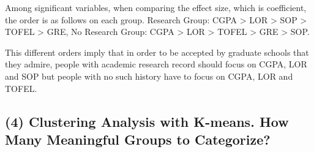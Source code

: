 \documentclass[11pt]{article}
\begin{document}
Among significant variables, when comparing the effect size, which is
coefficient, the order is as follows on each group. Research Group: CGPA
\textgreater{} LOR \textgreater{} SOP \textgreater{} TOFEL
\textgreater{} GRE, No Research Group: CGPA \textgreater{} LOR
\textgreater{} TOFEL \textgreater{} GRE \textgreater{} SOP.

This different orders imply that in order to be accepted by graduate
schools that they admire, people with academic research record should
focus on CGPA, LOR and SOP but people with no such history have to focus
on CGPA, LOR and TOFEL.

    \hypertarget{clustering-analysis-with-k-means.-how-many-meaningful-groups-to-categorize}{%
\subsection{(4) Clustering Analysis with K-means. How Many Meaningful
Groups to
Categorize?}\label{clustering-analysis-with-k-means.-how-many-meaningful-groups-to-categorize}}
\end{document}
